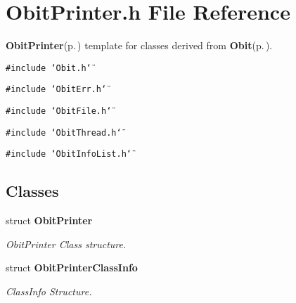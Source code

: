 \section{Obit\-Printer.h File Reference}
\label{ObitPrinter_8h}
{\bf Obit\-Printer}{\rm (p.\,\pageref{structObitPrinter})} template for classes derived from {\bf Obit}{\rm (p.\,\pageref{structObit})}. 

{\tt \#include \char`\"{}Obit.h\char`\"{}}\par
{\tt \#include \char`\"{}Obit\-Err.h\char`\"{}}\par
{\tt \#include \char`\"{}Obit\-File.h\char`\"{}}\par
{\tt \#include \char`\"{}Obit\-Thread.h\char`\"{}}\par
{\tt \#include \char`\"{}Obit\-Info\-List.h\char`\"{}}\par
\subsection*{Classes}
\begin{CompactItemize}
\item 
struct {\bf Obit\-Printer}
\begin{CompactList}\small\item\em Obit\-Printer Class structure. \item\end{CompactList}\item 
struct {\bf Obit\-Printer\-Class\-Info}
\begin{CompactList}\small\item\em Class\-Info Structure. \item\end{CompactList}\end{CompactItemize}
